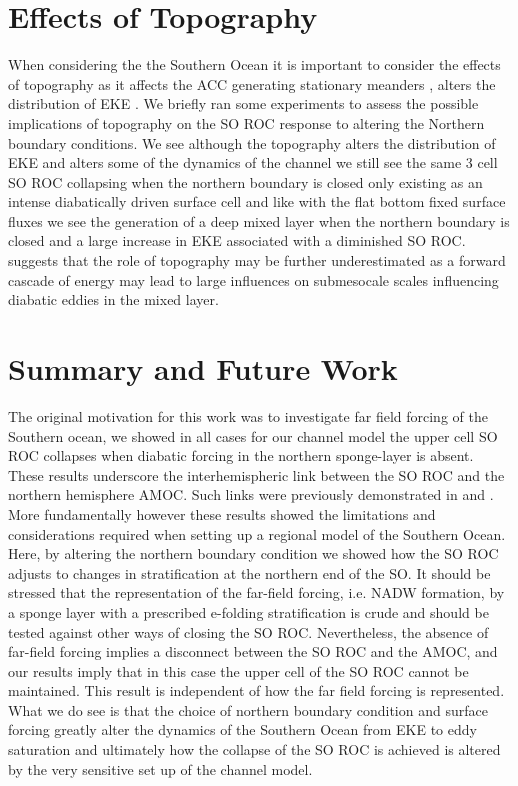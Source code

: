 \section{Effects of Topography}

When considering the the Southern Ocean it is important to consider the effects of topography as it affects the ACC generating stationary meanders \cite{NaveiraGarabato2009} %
, alters the distribution of EKE \citep{Thompson2012}. We briefly ran some experiments to assess the possible implications of topography on the SO ROC response to altering the Northern boundary conditions. We see although the topography alters the distribution of EKE and alters some of the dynamics of the channel we still see the same 3 cell SO ROC collapsing when the northern boundary is closed only existing as an intense diabatically driven surface cell and like with the flat bottom fixed surface fluxes we see the generation of a deep mixed layer when the northern boundary is closed and a large increase in EKE associated with a diminished SO ROC.
\cite{Rosso2015} suggests that the role of topography may be further underestimated as a forward cascade of energy may lead to large influences on submesocale scales influencing diabatic eddies in the mixed layer.

\section{Summary and Future Work}

The original motivation for this work was to investigate far field forcing of the Southern ocean, we showed in all cases for our channel model the upper cell SO ROC collapses when diabatic forcing in the northern sponge-layer is absent. These results underscore the interhemispheric link between the SO ROC and the northern hemisphere AMOC. Such links were previously demonstrated in \citet{Gnanadesikan2000} and \citet{Wolfe2011}. More fundamentally however these results showed the limitations and considerations required when setting up a regional model of the Southern Ocean.
Here, by altering the northern boundary condition we showed how the SO ROC adjusts to changes in stratification at the northern end of the SO.
It should be stressed that the representation of the far-field forcing, i.e. NADW formation, by a sponge layer with a prescribed e-folding stratification is crude and should be tested against other ways of closing the SO ROC. Nevertheless, the absence of far-field forcing implies a disconnect between the SO ROC and the AMOC, and our results imply that in this case the upper cell of the SO ROC cannot be maintained. This result is independent of how the far field forcing is represented. What we do see is that the choice of northern boundary condition and surface forcing greatly alter the dynamics of the Southern Ocean from EKE to eddy saturation and ultimately how the collapse of the SO ROC is achieved is altered by the very sensitive set up of the channel model. 

